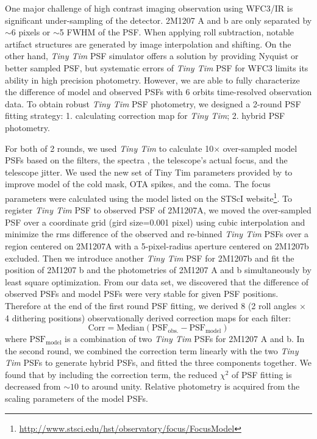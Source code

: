 \documentclass[apj]{emulateapj}
\newcommand{\tinytim}{\textit{Tiny Tim}}
\begin{document}
One major challenge of high contrast imaging observation using WFC3/IR
is significant under-sampling of the detector.  2M1207 A and b are
only separated by $\sim6$ pixels or $\sim$5 FWHM of the PSF. When
applying roll subtraction, notable artifact structures are generated
by image interpolation and shifting. On the other hand, \tinytim{} PSF
simulator\citep{Krist1995} offers a solution by providing Nyquist or better
sampled PSF, but systematic errors of \tinytim{} PSF for WFC3 limits
its ability in high precision photometry\citep{Biretta2014}. However,
we are able to fully characterize the difference of model and observed
PSFs with 6 orbits time-resolved observation data. To obtain robust \tinytim{} PSF
photometry, we designed a 2-round PSF fitting strategy: 1. calculating
correction map for \tinytim{}; 2. hybrid PSF photometry.

For both of 2 rounds, we used {\em Tiny Tim} to calculate 10$\times$
over-sampled model PSFs based on the filters, the spectra 
\citep{Bonnefoy2014, Patience2010}, the telescope's actual focus, and
the telescope jitter.  We used the new set of Tiny Tim parameters
provided by \cite{Biretta2014} to improve model of the cold mask,
OTA spikes, and the coma. The focus parameters were calculated
using the model listed on the STScI
website\footnote{\url{http://www.stsci.edu/hst/observatory/focus/FocusModel}}. To
register \tinytim{} PSF to observed PSF of 2M1207A, we moved the
over-sampled PSF over a coordinate grid (gird size=0.001 pixel) using
cubic interpolation and minimize the rms difference of the
observed and re-binned \tinytim{} PSFs over a region centered on 2M1207A with a
5-pixel-radius aperture centered on 2M1207b excluded. Then we introduce
another \tinytim{} PSF for 2M1207b and  fit the
position of 2M1207 b and the photometries of 2M1207 A and b simultaneously
by least square optimization. From our data set, we discovered that
the difference of observed PSFs and model PSFs were very stable for
given PSF positions. Therefore at the end of the first round PSF
fitting, we derived 8 (2 roll angles $\times$ 4 dithering positions)
observationally derived correction maps for each filter:
\begin{equation}
  \mathrm{Corr = Median(PSF_{obs.} - PSF_{model} )}
\end{equation}
where $\mathrm{PSF_{model}}$ is a combination of two \tinytim{} PSFs
for 2M1207 A and b. In the second round, we combined the correction
term linearly with the two \tinytim{} PSFs to generate hybrid PSFs,
and fitted the three components together. We found that by including the correction term,
the reduced $\chi^{2}$ of PSF fitting is decreased from $\sim 10$ to
around unity. Relative photometry is acquired from the scaling
parameters of the model PSFs.
\end{document}
